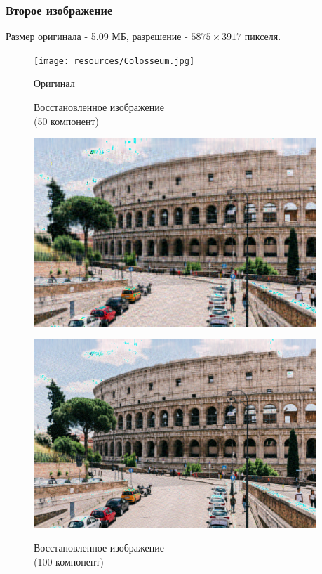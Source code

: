 \documentclass[a4paper]{article}
\begin{document}
\subsubsection{Второе изображение}
Размер оригинала - 5.09 МБ, разрешение - $5875\times 3917$ пикселя.
\begin{figure}[H]
    \centering
    \caption{Оригинал}
    \texttt{[image: resources/Colosseum.jpg]}
    \label{fig:colos}
\end{figure}
\begin{figure}[H]
\centering
    \begin{minipage}{.45\textwidth}
    \caption{Восстановленное изображение \\(50 компонент)}
    \includegraphics[width = 0.95\textwidth]{reconstructions/with_50comps_Colosseum.jpg}
    \label{fig:col_50}
    \end{minipage}%
    \begin{minipage}{.45\textwidth}
      \centering
    \caption{Восстановленное изображение \\(100 компонент)}
    \includegraphics[width = 0.95\textwidth]{reconstructions/with_100comps_Colosseum.jpg}
    \label{fig:col_100}
    \end{minipage}%
\end{figure}
\end{document}
